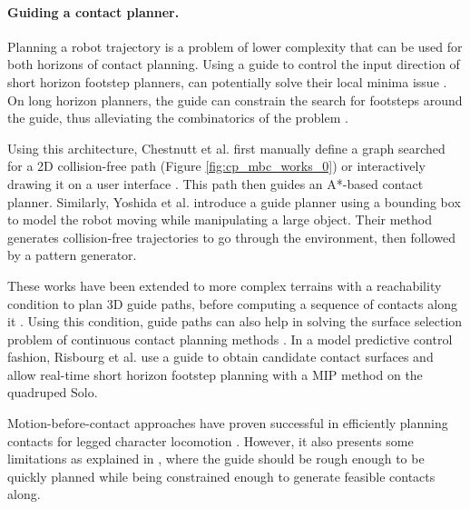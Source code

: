 \paragraph{Guiding a contact planner.}
Planning a robot trajectory is a problem of lower complexity that can be used for both horizons of contact planning.
Using a guide to control the input direction of short horizon footstep planners, can potentially solve their local minima issue \cite{norby_skd_2022}. 
On long horizon planners, the guide can constrain the search for footsteps around the guide, thus alleviating the combinatorics of the problem \cite{Hildebrandt_lola_2017}.

Using this architecture, Chestnutt et al. first manually define a graph searched for a 2D collision-free path \cite{chestnutt_tiered_planning_2004, Chestnutt2007NavigationPF} (Figure \ref{fig:cp_mbc_works_0}) or interactively drawing it on a user interface \cite{chestnutt_2009_interactive_guide}. This path then guides an A*-based contact planner.
Similarly, Yoshida et al. \cite{yoshida_2005} introduce a guide planner using a bounding box to model the robot moving while manipulating a large object. Their method generates collision-free trajectories to go through the environment, then followed by a pattern generator.

These works have been extended to more complex terrains with a reachability condition to plan 3D guide paths, before computing a sequence of contacts along it \cite{RB-PRM, AcyclicCP, rough_terrain_reachability_hutter_2021}.
Using this condition, guide paths can also help in solving the surface selection problem of continuous contact planning methods \cite{sl1m_v2}.
In a model predictive control fashion, Risbourg et al. \cite{fanny_mip_solo} 
use a guide to obtain candidate contact surfaces and allow real-time short horizon footstep planning with a MIP method on the quadruped Solo.

Motion-before-contact approaches have proven successful in efficiently planning contacts for legged character locomotion \cite{egges_2010, bouyarmane_2009, bouyarmane2018}.
However, it also presents some limitations as explained in \cite{escande_2008}, where the guide should be rough enough to be quickly planned while being constrained enough to generate feasible contacts along.

